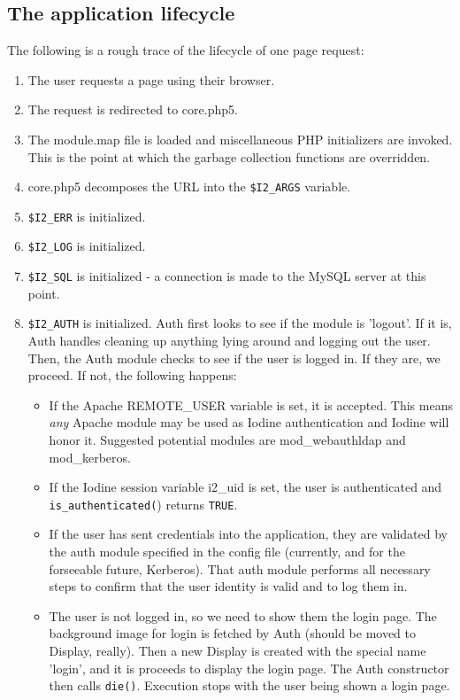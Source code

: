 \documentclass[11pt,letterpaper]{report}
\begin{document}
\subsection{The application lifecycle}
The following is a rough trace of the lifecycle of one page request:
\begin{enumerate}
	\item The user requests a page using their browser.
	\item The request is redirected to core.php5.
	\item The module.map file is loaded and miscellaneous PHP initializers
		are invoked.  This is the point at which the garbage collection
		functions are overridden.
	\item core.php5 decomposes the URL into the \lstinline{$I2_ARGS} variable.
	\item \lstinline{$I2_ERR} is initialized.
	\item \lstinline{$I2_LOG} is initialized.
	\item \lstinline{$I2_SQL} is initialized - a connection is made to the
		MySQL server at this point.
	\item \lstinline{$I2_AUTH} is initialized.  Auth first looks to
		see if the module is 'logout'.  If it is, Auth handles
		cleaning up anything lying around and logging out the user.
		Then, the Auth module checks to see if the user is logged in.
		If they are, we proceed.  If not, the following happens:
		\begin{itemize}
			\item If the Apache REMOTE\_USER variable is set, it is
				accepted.  This means \emph{any} Apache module may
				be used as Iodine authentication and Iodine will honor
				it.  Suggested potential modules are mod\_webauthldap
				and mod\_kerberos.
			\item If the Iodine session variable i2\_uid is set, the
				user is authenticated and \lstinline{is_authenticated(})
				returns \lstinline{TRUE}.
			\item If the user has sent credentials into the application,
				they are validated by the auth module specified in
				the config file (currently, and for the
				forseeable future, Kerberos).  That auth module
				performs all necessary steps to confirm that the
				user identity is valid and to log them in.
			\item The user is not logged in, so we need to show them
				the login page.  The background image for login is
				fetched by Auth (should be moved to Display, really).
				Then a new Display is created with the special name
				'login', and it is proceeds to display the login page.
				The Auth constructor then calls \lstinline{die()}.
				Execution stops with the user being shown a login page.
		\end{itemize}


\end{enumerate}
\end{document}
